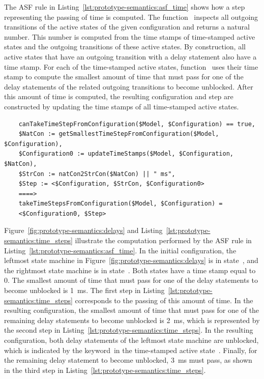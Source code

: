 The ASF rule in Listing~\ref{lst:prototype-semantics:asf_time} shows how a step representing the passing of time is computed.
The function~ inspects all outgoing transitions of the active states of the given configuration and returns a natural number.
This number is computed from the time stamps of time-stamped active states and the outgoing transitions of these active states.
By construction, all active states that have an outgoing transition with a delay statement also have a time stamp.
For each of the time-stamped active states, function~ uses their time stamp to compute the smallest amount of time that must pass for one of the delay statements of the related outgoing transitions to become unblocked.
After this amount of time is computed, the resulting configuration and step are constructed by updating the time stamps of all time-stamped active states.

\begin{listing}
  \lstset{
    language=asf,
    style=asf,
    caption=ASF rule that computes a step representing the passing of time,
    label=lst:prototype-semantics:asf_time,
    numbers=none
  }
  \begin{lstlisting}
    canTakeTimeStepFromConfiguration($Model, $Configuration) == true,
    $NatCon := getSmallestTimeStepFromConfiguration($Model, $Configuration),
    $Configuration0 := updateTimeStamps($Model, $Configuration, $NatCon),
    $StrCon := natCon2StrCon($NatCon) || " ms",
    $Step := <$Configuration, $StrCon, $Configuration0>
    ====>
    takeTimeStepsFromConfiguration($Model, $Configuration) =
    <$Configuration0, $Step>
  \end{lstlisting}
\end{listing}

Figure~\ref{fig:prototype-semantics:delays} and Listing~\ref{lst:prototype-semantics:time_steps} illustrate the computation performed by the ASF rule in Listing~\ref{lst:prototype-semantics:asf_time}.
In the initial configuration, the leftmost state machine in Figure~\ref{fig:prototype-semantics:delays} is in state~, and the rightmost state machine is in state~.
Both states have a time stamp equal to 0.
The smallest amount of time that must pass for one of the delay statements to become unblocked is 1~ms.
The first step in Listing~\ref{lst:prototype-semantics:time_steps} corresponds to the passing of this amount of time.
In the resulting configuration, the smallest amount of time that must pass for one of the remaining delay statements to become unblocked is 2~ms, which is represented by the second step in Listing~\ref{lst:prototype-semantics:time_steps}.
In the resulting configuration, both delay statements of the leftmost state machine are unblocked, which is indicated by the keyword~\TSPassed in the time-stamped active state~.
Finally, for the remaining delay statement to become unblocked, 3~ms must pass, as shown in the third step in Listing~\ref{lst:prototype-semantics:time_steps}.

